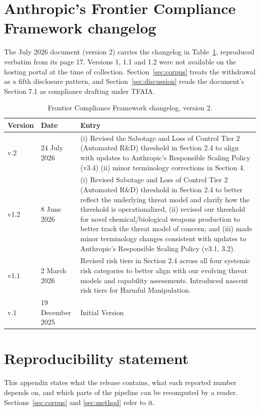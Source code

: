 \documentclass{article}
\begin{document}
\section{Anthropic's Frontier Compliance Framework changelog}
\label{apx:fcf}
The July 2026 document (version 2) carries the changelog in Table~\ref{tab:fcf}, reproduced verbatim from its page 17. Versions 1, 1.1 and 1.2 were not available on the hosting portal at the time of collection. Section~\ref{sec:corpus} treats the withdrawal as a fifth disclosure pattern, and Section~\ref{sec:discussion} reads the document's Section 7.1 as compliance drafting under TFAIA.
\begin{table}[tbp]\centering\small
\caption{Frontier Compliance Framework changelog, version 2.}
\label{tab:fcf}
\begin{tabular}{llp{9cm}}
\toprule Version & Date & Entry \\ \midrule
v.2 & 24 July 2026 & (i) Revised the Sabotage and Loss of Control Tier 2 (Automated R\&D) threshold in Section 2.4 to align with updates to Anthropic's Responsible Scaling Policy (v3.4) (ii) minor terminology corrections in Section 4. \\
v1.2 & 8 June 2026 & (i) Revised Sabotage and Loss of Control Tier 2 (Automated R\&D) threshold in Section 2.4 to better reflect the underlying threat model and clarify how the threshold is operationalized, (ii) revised our threshold for novel chemical/biological weapons production to better track the threat model of concern; and (iii) made minor terminology changes consistent with updates to Anthropic's Responsible Scaling Policy (v3.1, 3.2). \\
v1.1 & 2 March 2026 & Revised risk tiers in Section 2.4 across all four systemic risk categories to better align with our evolving threat models and capability assessments. Introduced nascent risk tiers for Harmful Manipulation. \\
v.1 & 19 December 2025 & Initial Version \\
\bottomrule
\end{tabular}
\end{table}


\section{Reproducibility statement}
\label{apx:repro}
This appendix states what the release contains, what each reported number depends on, and which parts of the pipeline can be recomputed by a reader. Sections~\ref{sec:corpus} and \ref{sec:method} refer to it.
\end{document}
